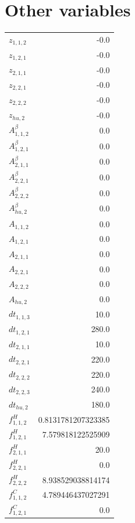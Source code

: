 \documentclass{article}%
\makeatletter
\let\mcnewpage=\newpage%
\newcommand{\TrickSupertabularIntoMulticols}{%
\renewcommand\newpage{%
\if@firstcolumn%
\hrule width\linewidth height0pt%
\columnbreak%
\else%
\mcnewpage%
\fi%
}%
}%
\makeatother
\begin{document}
\section{Other variables}%
\thispagestyle{plain}%
\begin{multicols*}{3}%
\TrickSupertabularIntoMulticols%
%
\begin{supertabular}{lr}%
	$z_{1,1,2}$ & -0.0 \\%
	$z_{1,2,1}$ & -0.0 \\%
	$z_{2,1,1}$ & -0.0 \\%
	$z_{2,2,1}$ & -0.0 \\%
	$z_{2,2,2}$ & -0.0 \\%
	$z_{hu,2}$ & -0.0 \\%
	$A_{1,1,2}^{\beta}$ & 0.0 \\%
	$A_{1,2,1}^{\beta}$ & 0.0 \\%
	$A_{2,1,1}^{\beta}$ & 0.0 \\%
	$A_{2,2,1}^{\beta}$ & 0.0 \\%
	$A_{2,2,2}^{\beta}$ & 0.0 \\%
	$A_{hu,2}^{\beta}$ & 0.0 \\%
	$A_{1,1,2}$ & 0.0 \\%
	$A_{1,2,1}$ & 0.0 \\%
	$A_{2,1,1}$ & 0.0 \\%
	$A_{2,2,1}$ & 0.0 \\%
	$A_{2,2,2}$ & 0.0 \\%
	$A_{hu,2}$ & 0.0 \\%
	$dt_{1,1,3}$ & 10.0 \\%
	$dt_{1,2,1}$ & 280.0 \\%
	$dt_{2,1,1}$ & 10.0 \\%
	$dt_{2,2,1}$ & 220.0 \\%
	$dt_{2,2,2}$ & 220.0 \\%
	$dt_{2,2,3}$ & 240.0 \\%
	$dt_{hu,2}$ & 180.0 \\%
	$f_{1,1,2}^{H}$ & 0.8131781207323385 \\%
	$f_{1,2,1}^{H}$ & 7.579818122525909 \\%
	$f_{2,1,1}^{H}$ & 20.0 \\%
	$f_{2,2,1}^{H}$ & 0.0 \\%
	$f_{2,2,2}^{H}$ & 8.938529038814174 \\%
	$f_{1,1,2}^{C}$ & 4.789446437027291 \\%
	$f_{1,2,1}^{C}$ & 0.0 \\%

\end{supertabular}
\end{multicols*}
\end{document}
